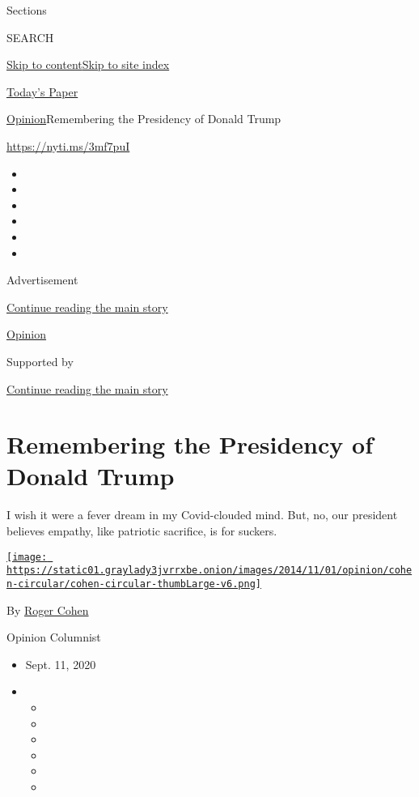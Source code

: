 Sections

SEARCH

\protect\hyperlink{site-content}{Skip to
content}\protect\hyperlink{site-index}{Skip to site index}

\href{https://myaccount.nytimes3xbfgragh.onion/auth/login?response_type=cookie\&client_id=vi}{}

\href{https://www.nytimes3xbfgragh.onion/section/todayspaper}{Today's
Paper}

\href{/section/opinion}{Opinion}\textbar{}Remembering the Presidency of
Donald Trump

\url{https://nyti.ms/3mf7puI}

\begin{itemize}
\item
\item
\item
\item
\item
\item
\end{itemize}

Advertisement

\protect\hyperlink{after-top}{Continue reading the main story}

\href{/section/opinion}{Opinion}

Supported by

\protect\hyperlink{after-sponsor}{Continue reading the main story}

\hypertarget{remembering-the-presidency-of-donald-trump}{%
\section{Remembering the Presidency of Donald
Trump}\label{remembering-the-presidency-of-donald-trump}}

I wish it were a fever dream in my Covid-clouded mind. But, no, our
president believes empathy, like patriotic sacrifice, is for suckers.

\href{https://www.nytimes3xbfgragh.onion/by/roger-cohen}{\texttt{[image: https://static01.graylady3jvrrxbe.onion/images/2014/11/01/opinion/cohen-circular/cohen-circular-thumbLarge-v6.png]}}

By \href{https://www.nytimes3xbfgragh.onion/by/roger-cohen}{Roger Cohen}

Opinion Columnist

\begin{itemize}
\item
  Sept. 11, 2020
\item
  \begin{itemize}
  \item
  \item
  \item
  \item
  \item
  \item
  \end{itemize}
\end{itemize}

